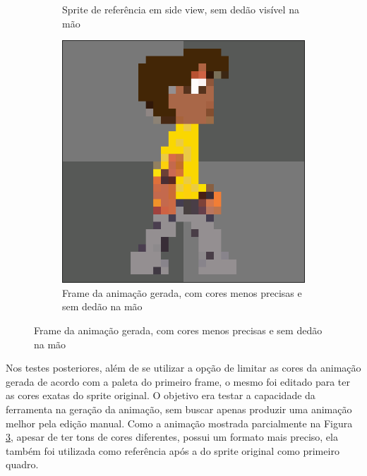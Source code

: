 \begin{figure}[htbp]
\begin{subfigure}{0.32\linewidth}
        \caption{\small Sprite de referência em side view, sem dedão visível na mão}
        \label{fig:pixelLabAnimaComparaGeminiSprite}
    \end{subfigure}
    \begin{subfigure}{0.32\linewidth}
        \includegraphics[width=1\linewidth]{figs/pixelLab/dia4/print1.PNG}
        \caption{\small Frame da animação gerada, com cores menos precisas e sem dedão na mão}
        \label{fig:pixelLabAnimaComparaGeminiGera}
    \end{subfigure}
\end{figure}

Nos testes posteriores, além de se utilizar a opção de limitar as cores da animação gerada de acordo com a paleta do primeiro frame, o mesmo foi editado para ter as cores exatas do sprite original. O objetivo era testar a capacidade da ferramenta na geração da animação, sem buscar apenas produzir uma animação melhor pela edição manual. Como a animação mostrada parcialmente na Figura \ref{fig:pixelLabAnimaComparaGeminiGera}, apesar de ter tons de cores diferentes, possui um formato mais preciso, ela também foi utilizada como referência após a do sprite original como primeiro quadro. 

